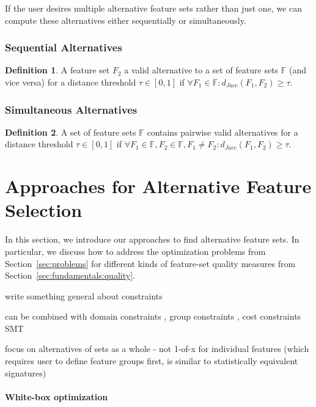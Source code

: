 \documentclass{article}
\theoremstyle{definition}
\newtheorem{definition}{Definition}
\begin{document}
If the user desires multiple alternative feature sets rather than just one, we can compute these alternatives either sequentially or simultaneously.

\subsubsection{Sequential Alternatives}
%
\begin{definition}
	A feature set $F_2$ a valid alternative to a set of feature sets $\mathbb{F}$ (and vice versa) for a distance threshold $\tau \in [0,1]$ if $\forall F_1 \in \mathbb{F}: d_{Jacc}(F_1,F_2) \geq \tau$.
\end{definition}
%
\subsubsection{Simultaneous Alternatives}
%
\begin{definition}
	A set of feature sets $\mathbb{F}$ contains pairwise valid alternatives for a distance threshold $\tau \in [0,1]$ if $\forall F_1 \in \mathbb{F}, F_2 \in \mathbb{F}, F_1 \neq F_2: d_{Jacc}(F_1,F_2) \geq \tau$.
\end{definition}
%
\section{Approaches for Alternative Feature Selection}
\label{sec:approaches}

In this section, we introduce our approaches to find alternative feature sets.
In particular, we discuss how to address the optimization problems from Section~\ref{sec:problems} for different kinds of feature-set quality measures from Section~\ref{sec:fundamentals:quality}.

write something general about constraints

can be combined with domain constraints \cite{groves2015toward}, group constraints \cite{yuan2006model}, cost constraints \cite{paclik2002feature}
SMT \cite{barrett2018satisfiability}

focus on alternatives of sets as a whole - not 1-of-x for individual features (which requires user to define feature groups first, is similar to statistically equivalent signatures)

\paragraph{White-box optimization}
\end{document}
